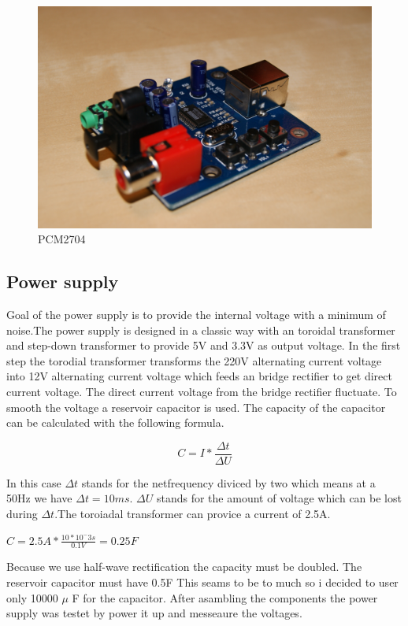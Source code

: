 \begin{figure}[h!]
\begin{center}
\includegraphics[scale=0.35]{pictures/pcm2704}
\caption{PCM2704}
\end{center}
\end{figure}

\subsection{Power supply}
Goal of the power supply is to provide the internal voltage with a minimum of noise.The power supply is designed in a classic way with an toroidal transformer and step-down transformer to provide 5V and 3.3V as output voltage. In the first step the torodial transformer transforms the 220V alternating current voltage into 12V alternating current voltage which feeds an bridge rectifier to get direct current voltage. The direct current voltage from the bridge rectifier fluctuate. To smooth the voltage a reservoir capacitor is used. The capacity of the capacitor can be calculated with the following formula.


\begin{equation}
	C=I*\frac{\Delta t}{\Delta U}
	\label{reservoidCapacitor}
\end{equation} 

In this case $\Delta t$ stands for the netfrequency diviced by two which means at a 50Hz we have $\Delta t = 10ms$. $\Delta U$ stands for the amount of voltage which can be lost during $\Delta t$.The toroiadal transformer can provice a current of 2.5A. 
\begin{center}
	$C=2.5A * \frac{10*10^-3s}{0.1V}=0.25F$
\end{center}
Because we use half-wave rectification the capacity must be doubled. The reservoir capacitor must have 0.5F
This seams to be to much so i decided to user only 10000 $\mu$ F for the capacitor. After asambling the components the power supply was testet by power it up and messeaure the voltages.

